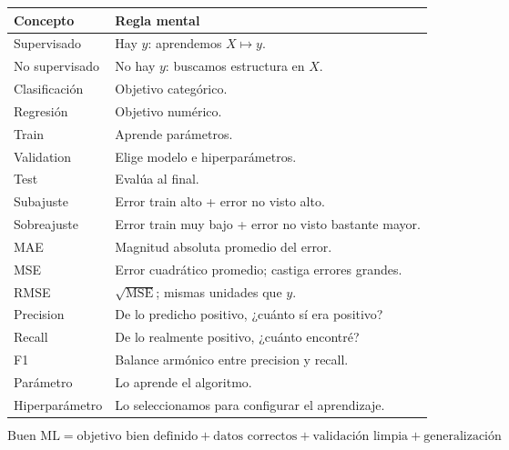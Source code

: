 \documentclass[11pt]{article}
\begin{document}
\begin{center}
\renewcommand{\arraystretch}{1.35}
\begin{tabular}{p{}p{}}
\toprule
Concepto & Regla mental\\
\midrule
Supervisado & Hay $y$: aprendemos $X\mapsto y$.\\
No supervisado & No hay $y$: buscamos estructura en $X$.\\
Clasificación & Objetivo categórico.\\
Regresión & Objetivo numérico.\\
Train & Aprende parámetros.\\
Validation & Elige modelo e hiperparámetros.\\
Test & Evalúa al final.\\
Subajuste & Error train alto + error no visto alto.\\
Sobreajuste & Error train muy bajo + error no visto bastante mayor.\\
MAE & Magnitud absoluta promedio del error.\\
MSE & Error cuadrático promedio; castiga errores grandes.\\
RMSE & $\sqrt{\mathrm{MSE}}$; mismas unidades que $y$.\\
Precision & De lo predicho positivo, ¿cuánto sí era positivo?\\
Recall & De lo realmente positivo, ¿cuánto encontré?\\
F1 & Balance armónico entre precision y recall.\\
Parámetro & Lo aprende el algoritmo.\\
Hiperparámetro & Lo seleccionamos para configurar el aprendizaje.\\
\bottomrule
\end{tabular}
\end{center}

\begin{clave}
\[
\boxed{\text{Buen ML} = \text{objetivo bien definido} + \text{datos correctos} + \text{validación limpia} + \text{generalización}}
\]
\end{clave}
\end{document}
